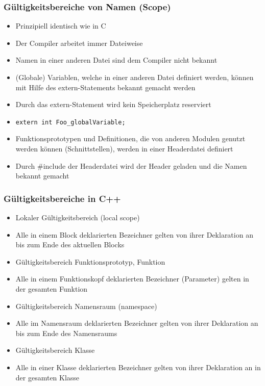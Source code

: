 \subsubsection{Gültigkeitsbereiche von Namen (Scope)\hfill}
\label{sec:Gueltigkeitsbereiche von Namen (Scope)}
\begin{itemize}
	\item Prinzipiell identisch wie in C
	\item Der Compiler arbeitet immer Dateiweise
	\item Namen in einer anderen Datei sind dem Compiler nicht bekannt
	\item (Globale) Variablen, welche in einer anderen Datei definiert werden, können mit Hilfe des extern-Statements bekannt gemacht werden
	\item Durch das extern-Statement wird kein Speicherplatz reserviert
	\item[\-]
	\noindent
\begin{minipage}{\linewidth}
\begin{lstlisting}
extern int Foo_globalVariable;
\end{lstlisting}
\end{minipage}
	\item Funktionsprototypen und Definitionen, die von anderen Modulen genutzt werden können (Schnittstellen), werden in einer Headerdatei definiert
	\item Durch \#include der Headerdatei wird der Header geladen und die Namen bekannt gemacht
\end{itemize}

\subsubsection{Gültigkeitsbereiche in C++\hfill}
\label{sec:Gueltigkeitsbereiche in C++}
\begin{itemize}
	\item Lokaler Gültigkeitsbereich (local scope)
	\item[\-] Alle in einem Block deklarierten Bezeichner gelten von ihrer Deklaration an bis zum Ende des aktuellen Blocks
	\item Gültigkeitsbereich Funktionsprototyp, Funktion
	\item[\-] Alle in einem Funktionskopf deklarierten Bezeichner (Parameter) gelten in der gesamten Funktion
	\item Gültigkeitsbereich Namensraum (namespace)
	\item[\-] Alle im Namensraum deklarierten Bezeichner gelten von ihrer Deklaration an bis zum Ende des Namensraums
	\item Gültigkeitsbereich Klasse
	\item[\-] Alle in einer Klasse deklarierten Bezeichner gelten von ihrer Deklaration an in der gesamten Klasse
\end{itemize}

